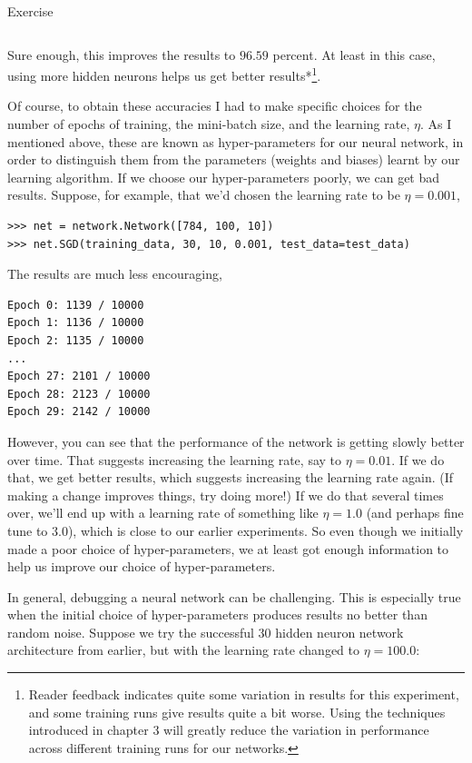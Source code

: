 \begin{exerciseBox}{Exercise}
\begin{lstlisting}
\end{lstlisting}


Sure enough, this improves the results to $96.59$ percent. At least in this case, using more hidden neurons helps us get better results*\footnote{Reader feedback indicates quite some variation in results for this experiment, and some training runs give results quite a bit worse. Using the techniques introduced in chapter 3 will greatly reduce the variation in performance across different training runs for our networks.}.


Of course, to obtain these accuracies I had to make specific choices for the number of epochs of training, the mini-batch size, and the learning rate, $\eta$. As I mentioned above, these are known as hyper-parameters for our neural network, in order to distinguish them from the parameters (weights and biases) learnt by our learning algorithm. If we choose our hyper-parameters poorly, we can get bad results. Suppose, for example, that we'd chosen the learning rate to be $\eta = 0.001$,



\begin{lstlisting}
>>> net = network.Network([784, 100, 10])
>>> net.SGD(training_data, 30, 10, 0.001, test_data=test_data)

\end{lstlisting}


The results are much less encouraging,



\begin{lstlisting}
Epoch 0: 1139 / 10000
Epoch 1: 1136 / 10000
Epoch 2: 1135 / 10000
...
Epoch 27: 2101 / 10000
Epoch 28: 2123 / 10000
Epoch 29: 2142 / 10000

\end{lstlisting}


However, you can see that the performance of the network is getting slowly better over time. That suggests increasing the learning rate, say to $\eta = 0.01$. If we do that, we get better results, which suggests increasing the learning rate again. (If making a change improves things, try doing more!) If we do that several times over, we'll end up with a learning rate of something like $\eta = 1.0$ (and perhaps fine tune to $3.0$), which is close to our earlier experiments. So even though we initially made a poor choice of hyper-parameters, we at least got enough information to help us improve our choice of hyper-parameters.


In general, debugging a neural network can be challenging. This is especially true when the initial choice of hyper-parameters produces results no better than random noise. Suppose we try the successful 30 hidden neuron network architecture from earlier, but with the learning rate changed to $\eta = 100.0$:




\end{exerciseBox}
